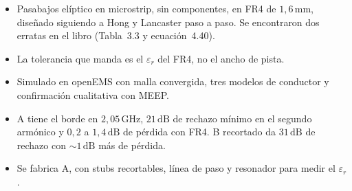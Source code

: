 \begin{itemize}
  \item Pasabajos elíptico en microstrip, sin componentes, en FR4 de
    $1{,}6\,\text{mm}$, diseñado siguiendo a Hong y Lancaster paso a paso.
    Se encontraron dos erratas en el libro (Tabla~3.3 y ecuación~4.40).
  \item La tolerancia que manda es el $\varepsilon_r$ del FR4, no el ancho de
    pista.
  \item Simulado en openEMS con malla convergida, tres modelos de conductor y
    confirmación cualitativa con MEEP.
  \item A tiene el borde en $2{,}05\,\text{GHz}$, $21\,\text{dB}$ de rechazo
    mínimo en el segundo armónico y $0{,}2$ a $1{,}4\,\text{dB}$ de pérdida con
    FR4. B recortado da $31\,\text{dB}$ de rechazo con $\sim\!1\,\text{dB}$ más
    de pérdida.
  \item Se fabrica A, con stubs recortables, línea de paso y resonador para
    medir el $\varepsilon_r$.
\end{itemize}
